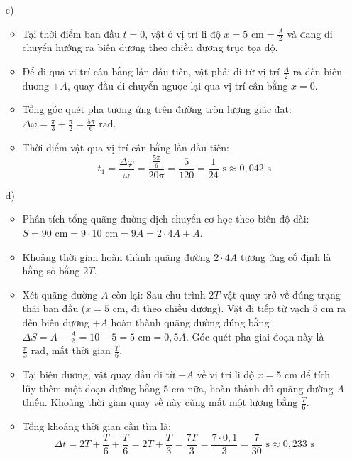 \begin{ex}
{\begin{enumerate}
\begin{itemize}
					\item Vì vận tốc ban đầu mang giá trị dương ($v > 0$) nên ta chọn giá trị pha ban đầu mang dấu âm tương ứng: $\varphi = -\frac{\pi}{3}\text{ rad}$.
					\item Phương trình dao động điều hoà của vật là: $x = 10\cos\left(20\pi t - \frac{\pi}{3}\right)\text{ cm}$.
				\end{itemize}
				\item[c)] 
				\begin{itemize}
					\item Tại thời điểm ban đầu $t=0$, vật ở vị trí li độ $x = 5\text{ cm} = \frac{A}{2}$ và đang di chuyển hướng ra biên dương theo chiều dương trục tọa độ.
					\item Để đi qua vị trí cân bằng lần đầu tiên, vật phải đi từ vị trí $\frac{A}{2}$ ra đến biên dương $+A$, quay đầu di chuyển ngược lại qua vị trí cân bằng $x=0$.
					\item Tổng góc quét pha tương ứng trên đường tròn lượng giác đạt: $\Delta \varphi = \frac{\pi}{3} + \frac{\pi}{2} = \frac{5\pi}{6}\text{ rad}$.
					\item Thời điểm vật qua vị trí cân bằng lần đầu tiên: 
					$$t_1 = \frac{\Delta \varphi}{\omega} = \frac{\frac{5\pi}{6}}{20\pi} = \frac{5}{120} = \frac{1}{24}\text{ s} \approx 0,042\text{ s} \text{}$$
				\end{itemize}
				\item[d)] 
				\begin{itemize}
					\item Phân tích tổng quãng đường dịch chuyển cơ học theo biên độ dài: $S = 90\text{ cm} = 9 \cdot 10\text{ cm} = 9A = 2 \cdot 4A + A$.
					\item Khoảng thời gian hoàn thành quãng đường $2 \cdot 4A$ tương ứng cố định là hằng số bằng $2T$.
					\item Xét quãng đường $A$ còn lại: Sau chu trình $2T$ vật quay trở về đúng trạng thái ban đầu ($x = 5\text{ cm}$, đi theo chiều dương). Vật đi tiếp từ vạch $5\text{ cm}$ ra đến biên dương $+A$ hoàn thành quãng đường đúng bằng $\Delta S = A - \frac{A}{2} = 10 - 5 = 5\text{ cm} = 0,5A$. Góc quét pha giai đoạn này là $\frac{\pi}{3}\text{ rad}$, mất thời gian $\frac{T}{6}$.
					\item Tại biên dương, vật quay đầu đi từ $+A$ về vị trí li độ $x = 5\text{ cm}$ để tích lũy thêm một đoạn đường bằng $5\text{ cm}$ nữa, hoàn thành đủ quãng đường $A$ thiếu. Khoảng thời gian quay về này cũng mất một lượng bằng $\frac{T}{6}$.
					\item Tổng khoảng thời gian cần tìm là:
					$$\Delta t = 2T + \frac{T}{6} + \frac{T}{6} = 2T + \frac{T}{3} = \frac{7T}{3} = \frac{7 \cdot 0,1}{3} = \frac{7}{30}\text{ s} \approx 0,233\text{ s} \text{}$$
				\end{itemize}
			\end{enumerate}
		}
	\end{ex}
	
